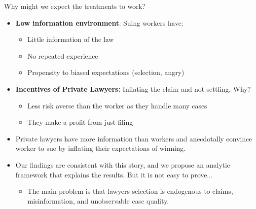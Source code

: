 \documentclass[9pt]{beamer}
\begin{document}
\begin{frame}{Why might we expect the treatments to work?}

    \begin{itemize}
        \item \textbf{Low information environment}: Suing workers have:
        \begin{itemize}
            \item Little information of the law
            \item No repeated experience
            \item Propensity to biased expectations (selection, angry)
        \end{itemize}
        \vspace{0.1in}
        \item \textbf{Incentives of Private Lawyers:} Inflating the claim and not settling. Why?
        \begin{itemize}
                \item Less risk averse than the worker as they handle many cases
                \item They make a profit from just filing 
         \end{itemize}
          \vspace{0.1in}
        \item Private lawyers have more information than workers and anecdotally convince worker to sue by inflating their expectations of winning. 
\vspace{0.1in}
        \item{Our findings are consistent with this story, and we propose an analytic framework that explains the results. But it is not easy to prove...} 
            \begin{itemize}
                \item The main problem is that lawyers selection is endogenous to claims, misinformation, and unobservable case quality.
            \end{itemize}
    \end{itemize}
\end{frame}
\end{document}
